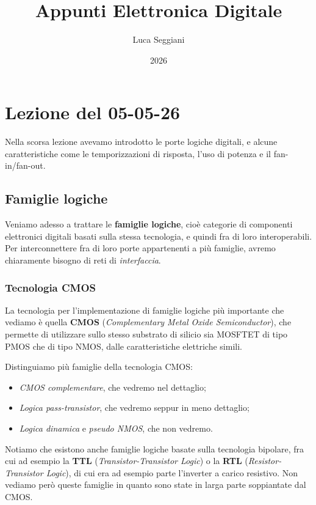 \documentclass[a4paper,11pt]{article}
\title{Appunti Elettronica Digitale}
\author{Luca Seggiani}
\date{2026}
\begin{document}
\section{Lezione del 05-05-26}

\thispagestyle{empty}
\pagestyle{fancy}

Nella scorsa lezione avevamo introdotto le porte logiche digitali, e alcune caratteristiche come le temporizzazioni di risposta, l'uso di potenza e il fan-in/fan-out.

\subsection{Famiglie logiche}
Veniamo adesso a trattare le \textbf{famiglie logiche}, cioè categorie di componenti elettronici digitali basati sulla stessa tecnologia, e quindi fra di loro interoperabili. Per interconnettere fra di loro porte appartenenti a più famiglie, avremo chiaramente bisogno di reti di \textit{interfaccia}.

\subsubsection{Tecnologia CMOS}
La tecnologia per l'implementazione di famiglie logiche più importante che vediamo è quella \textbf{CMOS} (\textit{Complementary Metal Oxide Semiconductor}), che permette di utilizzare sullo stesso substrato di silicio sia MOSFTET di tipo PMOS che di tipo NMOS, dalle caratteristiche elettriche simili.

Distinguiamo più famiglie della tecnologia CMOS:
\begin{itemize}
	\item \textit{CMOS complementare}, che vedremo nel dettaglio;
	\item \textit{Logica pass-transistor}, che vedremo seppur in meno dettaglio;
	\item \textit{Logica dinamica} e \textit{pseudo NMOS}, che non vedremo.
\end{itemize}

Notiamo che esistono anche famiglie logiche basate sulla tecnologia bipolare, fra cui ad esempio la \textbf{TTL} (\textit{Transistor-Transistor Logic}) o la \textbf{RTL} (\textit{Resistor-Transistor Logic}), di cui era ad esempio parte l'inverter a carico resistivo. Non vediamo però queste famiglie in quanto sono state in larga parte soppiantate dal CMOS.
\end{document}
